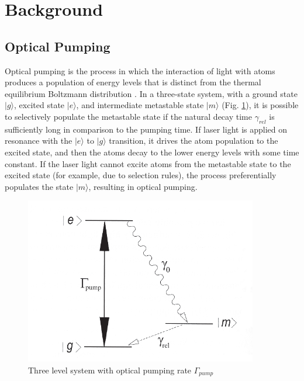 
\section{Background}\label{background}

\subsection{Optical Pumping}\label{opticalpumping}

Optical pumping is the process in which the interaction of light with
atoms produces a population of energy levels that is distinct from the
thermal equilibrium Boltzmann distribution \cite{bernheim}. In a
three-state system, with a ground state $|g\rangle$, excited state
$|e\rangle$, and intermediate metastable state $|m\rangle$
(Fig. \ref{fig:pumping}), it is possible to selectively populate the metastable
state if the natural decay time $\gamma_{rel}$ is sufficiently long in
comparison to the pumping time. If laser light is applied on resonance
with the $|e\rangle$ to $|g\rangle$ transition, it drives the atom
population to the excited state, and then the atoms decay to the lower
energy levels with some time constant. If the laser light cannot
excite atoms from the metastable state to the excited state (for
example, due to selection rules), the process preferentially populates
the state $|m\rangle$, resulting in optical pumping.


\begin{figure}[h]
\begin{center}
\includegraphics[width=4in]{figures/pumping.eps}
\caption{\small{Three level system with optical pumping rate $\Gamma_{pump}$}}
\label{fig:pumping}
\end{center}
\end{figure}


